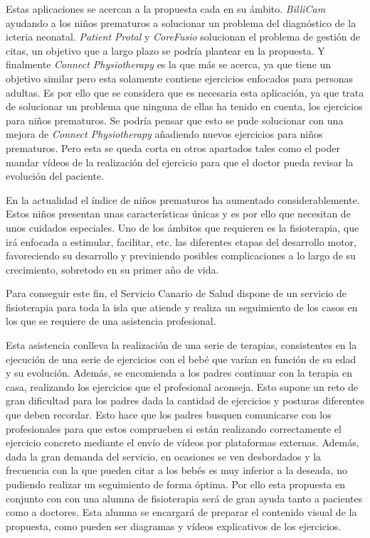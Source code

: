 \medskip
Estas aplicaciones se acercan a la propuesta cada en su ámbito. \textit{BilliCam} ayudando
a los niños prematuros a solucionar un problema del diagnóstico de la icteria neonatal.
\textit{Patient Protal} y \textit{CoreFusio} solucionan el problema de gestión de citas, un
objetivo que a largo plazo se podría plantear en la propuesta. Y finalmente
\textit{Connect Physiotherapy} es la que más se acerca, ya que tiene un objetivo similar
pero esta solamente contiene ejercicios enfocados para personas adultas. Es por ello que
se considera que es necesaria esta aplicación, ya que trata de solucionar un problema que
ninguna de ellas ha tenido en cuenta, los ejercicios para niños prematuros. Se podría pensar
que esto se pude solucionar con una mejora de \textit{Connect Physiotherapy} añadiendo nuevos
ejercicios para niños prematuros. Pero esta se
queda corta en otros apartados tales como el poder mandar vídeos de la realización del
ejercicio para que el doctor pueda revisar la evolución del paciente.

\bigskip
En la actualidad el índice de niños prematuros ha aumentado considerablemente. Estos niños presentan
unas características únicas y es por ello que necesitan de unos cuidados especiales. Uno de los
ámbitos que requieren es la fisioterapia, que irá enfocada a estimular, facilitar, etc. las
diferentes etapas del desarrollo motor, favoreciendo su desarrollo y previniendo posibles
complicaciones a lo largo de su crecimiento, sobretodo en su primer año de vida.

Para conseguir este fin, el Servicio Canario de Salud dispone de un servicio de fisioterapia
para toda la isla que atiende y realiza un seguimiento de los casos en los que se requiere de
una asistencia profesional.

Esta asistencia conlleva la realización de una serie de terapias, consistentes en
la ejecución de una serie de ejercicios con el bebé que varían en función de su edad y su
evolución. Además, se encomienda a los padres continuar con la terapia en casa, realizando
los ejercicios que el profesional aconseja. Esto supone un reto de gran dificultad para los
padres dada la cantidad de ejercicios y posturas diferentes que deben recordar. Esto hace que
los padres busquen comunicarse con los profesionales para que estos comprueben si están
realizando correctamente el ejercicio concreto mediante el envío de vídeos por plataformas
externas. Además, dada la gran demanda del servicio, en ocasiones se ven desbordados y la
frecuencia con la que pueden citar a los bebés es muy inferior a la deseada, no pudiendo
realizar un seguimiento de forma óptima. Por ello esta propuesta en conjunto
con con una alumna de fisioterapia será de gran ayuda tanto
a pacientes como a doctores. Esta alumna se encargará de preparar el
contenido visual de la propuesta, como pueden ser diagramas y vídeos
explicativos de los ejercicios.

